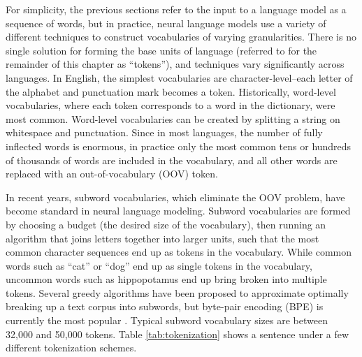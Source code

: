 For simplicity, the previous sections refer to the input to a language model as a sequence of words, but in practice, neural language models use a variety of different techniques to construct vocabularies of varying granularities.
There is no single solution for forming the base units of language (referred to for the remainder of this chapter as ``tokens''), and techniques vary significantly across languages.
In English, the simplest vocabularies are character-level--each letter of the alphabet and punctuation mark becomes a token.
Historically, word-level vocabularies, where each token corresponds to a word in the dictionary, were most common.
Word-level vocabularies can be created by splitting a string on whitespace and punctuation.
Since in most languages, the number of fully inflected words is enormous, in practice only the most common tens or hundreds of thousands of words are included in the vocabulary, and all other words are replaced with an out-of-vocabulary (OOV) token.

In recent years, subword vocabularies, which eliminate the OOV problem, have become standard in neural language modeling.
Subword vocabularies are formed by choosing a budget (the desired size of the vocabulary), then running an algorithm that joins letters together into larger units, such that the most common character sequences end up as tokens in the vocabulary.
While common words such as ``cat'' or ``dog'' end up as single tokens in the vocabulary, uncommon words such as hippopotamus end up bring broken into multiple tokens.
Several greedy algorithms have been proposed to approximate optimally breaking up a text corpus into subwords, but byte-pair encoding (BPE) is currently the most popular \citep{sennrich2016neural}.
Typical subword vocabulary sizes are between 32,000 and 50,000 tokens.
Table \ref{tab:tokenization} shows a sentence under a few different tokenization schemes.

